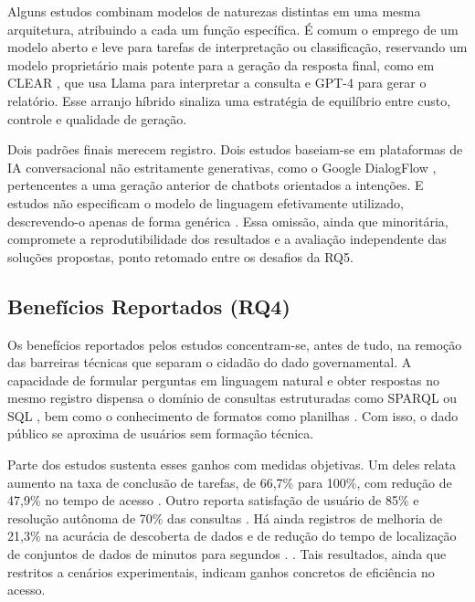 Alguns estudos combinam modelos de naturezas distintas em uma mesma arquitetura, atribuindo a cada um função específica. É comum o emprego de um modelo aberto e leve para tarefas de interpretação ou classificação, reservando um modelo proprietário mais potente para a geração da resposta final, como em CLEAR \citep{CLEAR2025}, que usa Llama para interpretar a consulta e GPT-4 para gerar o relatório. Esse arranjo híbrido sinaliza uma estratégia de equilíbrio entre custo, controle e qualidade de geração.

Dois padrões finais merecem registro. Dois estudos baseiam-se em plataformas de IA conversacional não estritamente generativas, como o Google DialogFlow \citep{ChatbotMadrid2021,TrendsChatbots2023}, pertencentes a uma geração anterior de chatbots orientados a intenções. E  estudos não especificam  o modelo de linguagem efetivamente utilizado, descrevendo-o apenas de forma genérica \ifhl\mbox{\colorbox{yellow}{\citep{Ryu2025}}}\else\citep{Ryu2025}\fi. Essa omissão, ainda que minoritária, compromete a reprodutibilidade dos resultados e a avaliação independente das soluções propostas, ponto retomado entre os desafios da RQ5.

\subsection{Benefícios Reportados (RQ4)}
\label{subsec:rq4}

Os benefícios reportados pelos estudos concentram-se, antes de tudo, na remoção das barreiras técnicas que separam o cidadão do dado governamental. A capacidade de formular perguntas em linguagem natural e obter respostas no mesmo registro dispensa o domínio de consultas estruturadas como SPARQL ou SQL \citep{EvaluatingLLMsOGD2025,DesigningODAssistant2024}, bem como o conhecimento de formatos como planilhas \citep{ChatbotMadrid2021}. Com isso, o dado público se aproxima de usuários sem formação técnica.

Parte dos estudos sustenta esses ganhos com medidas objetivas. Um deles relata aumento na taxa de conclusão de tarefas, de 66,7\% para 100\%, com redução de 47,9\% no tempo de acesso \citep{ChatbotMadrid2021}. Outro reporta satisfação de usuário de 85\% e resolução autônoma de 70\% das consultas \citep{Ingole2024}. Há ainda registros de melhoria de 21,3\% na acurácia de descoberta de dados \citep{Gan2026} e de redução do tempo de localização de conjuntos de dados de minutos para segundos \citep{DesigningODAssistant2024}. \ifhl\mbox{\colorbox{yellow}{\citep{Syahidi2025}}}\else\citep{Syahidi2025}\fi{}\ifhl\mbox{\colorbox{yellow}{\citep{Ryu2025}}}\else\citep{Ryu2025}\fi. Tais resultados, ainda que restritos a cenários experimentais, indicam ganhos concretos de eficiência no acesso.

